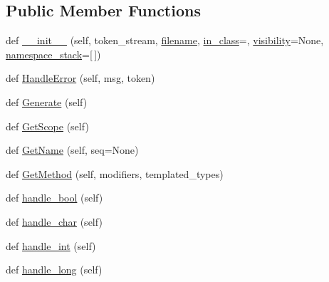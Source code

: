 \subsection*{Public Member Functions}
\begin{DoxyCompactItemize}
\item 
def \mbox{\hyperlink{classscripts_1_1generator_1_1cpp_1_1ast_1_1_ast_builder_a2d3a5b858874aac95874950ba19bb9b5}{\+\_\+\+\_\+init\+\_\+\+\_\+}} (self, token\+\_\+stream, \mbox{\hyperlink{classscripts_1_1generator_1_1cpp_1_1ast_1_1_ast_builder_a25cc8fa14bd93d009aa5f090c5d4dccc}{filename}}, \mbox{\hyperlink{classscripts_1_1generator_1_1cpp_1_1ast_1_1_ast_builder_ac0a39f1899bb14c1a3ec858ef288cd58}{in\+\_\+class}}=\textquotesingle{}\textquotesingle{}, \mbox{\hyperlink{classscripts_1_1generator_1_1cpp_1_1ast_1_1_ast_builder_a5bcdc6b1797cbb658a270387fa6373ef}{visibility}}=None, \mbox{\hyperlink{classscripts_1_1generator_1_1cpp_1_1ast_1_1_ast_builder_afa28bf61d2a0e8a44f839c1652fa06e3}{namespace\+\_\+stack}}=\mbox{[}$\,$\mbox{]})
\item 
def \mbox{\hyperlink{classscripts_1_1generator_1_1cpp_1_1ast_1_1_ast_builder_a8e9cad542601d43abffc4ab18bb0dcf8}{Handle\+Error}} (self, msg, token)
\item 
def \mbox{\hyperlink{classscripts_1_1generator_1_1cpp_1_1ast_1_1_ast_builder_aeda89f12f829be17e4685137f9228d01}{Generate}} (self)
\item 
def \mbox{\hyperlink{classscripts_1_1generator_1_1cpp_1_1ast_1_1_ast_builder_a93005e8e5a09c89a91078ed3ab4dfb14}{Get\+Scope}} (self)
\item 
def \mbox{\hyperlink{classscripts_1_1generator_1_1cpp_1_1ast_1_1_ast_builder_a299b84bc6a3cbff4440f0b7ed93a9e0f}{Get\+Name}} (self, seq=None)
\item 
def \mbox{\hyperlink{classscripts_1_1generator_1_1cpp_1_1ast_1_1_ast_builder_a989150725cc40ea18e08d646056f84c8}{Get\+Method}} (self, modifiers, templated\+\_\+types)
\item 
def \mbox{\hyperlink{classscripts_1_1generator_1_1cpp_1_1ast_1_1_ast_builder_aff332977dcdca558e023d5656c86eaed}{handle\+\_\+bool}} (self)
\item 
def \mbox{\hyperlink{classscripts_1_1generator_1_1cpp_1_1ast_1_1_ast_builder_ab49625fbaa2c5117172df96496635cac}{handle\+\_\+char}} (self)
\item 
def \mbox{\hyperlink{classscripts_1_1generator_1_1cpp_1_1ast_1_1_ast_builder_a9d13e308c32c230f3171c1f65d32441b}{handle\+\_\+int}} (self)
\item 
def \mbox{\hyperlink{classscripts_1_1generator_1_1cpp_1_1ast_1_1_ast_builder_aa37f26fc75f1ca2ee373fb8c3839e9c1}{handle\+\_\+long}} (self)

\end{DoxyCompactItemize}
